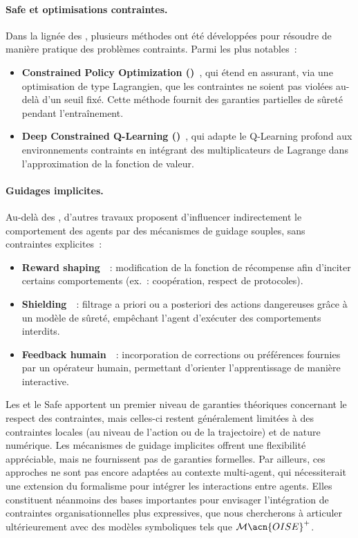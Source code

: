 \paragraph{Safe  et optimisations contraintes.}
Dans la lignée des , plusieurs méthodes ont été développées pour résoudre de manière pratique
des problèmes contraints. Parmi les plus notables~:
\begin{itemize}
  \item \textbf{Constrained Policy Optimization ()}~\cite{achiam2017constrained},
        qui étend  en assurant,
        via une optimisation de type Lagrangien, que les contraintes ne soient
        pas violées au-delà d’un seuil fixé. Cette méthode fournit des garanties
        partielles de sûreté pendant l’entraînement.
  \item \textbf{Deep Constrained Q-Learning ()}~\cite{kalweit2020deep},
        qui adapte le Q-Learning profond aux environnements contraints
        en intégrant des multiplicateurs de Lagrange dans l’approximation
        de la fonction de valeur.
\end{itemize}

\paragraph{Guidages implicites.}
Au-delà des , d’autres travaux proposent d’influencer indirectement
le comportement des agents par des mécanismes de guidage souples,
sans contraintes explicites~:
\begin{itemize}
  \item \textbf{Reward shaping}~\cite{ng1999policy}~: modification de la fonction
        de récompense afin d’inciter certains comportements (ex.~: coopération,
        respect de protocoles).
  \item \textbf{Shielding}~\cite{amodei2016concrete}~: filtrage a priori ou a posteriori
        des actions dangereuses grâce à un modèle de sûreté,
        empêchant l’agent d’exécuter des comportements interdits.
  \item \textbf{Feedback humain}~\cite{warnell2018deep}~: incorporation de corrections
        ou préférences fournies par un opérateur humain,
        permettant d’orienter l’apprentissage de manière interactive.
\end{itemize}

Les  et le Safe  apportent un premier niveau de garanties théoriques concernant le respect des contraintes, mais celles-ci restent généralement limitées à des contraintes locales (au niveau de l’action ou de la trajectoire) et de nature numérique. Les mécanismes de guidage implicites offrent une flexibilité appréciable, mais ne fournissent pas de garanties formelles. Par ailleurs, ces approches ne sont pas encore adaptées au contexte multi-agent, qui nécessiterait une extension du formalisme pour intégrer les interactions entre agents. Elles constituent néanmoins des bases importantes pour envisager l’intégration de contraintes organisationnelles plus expressives, que nous chercherons à articuler ultérieurement avec des modèles symboliques tels que $\mathcal{M}\acn{OISE}^+$.

